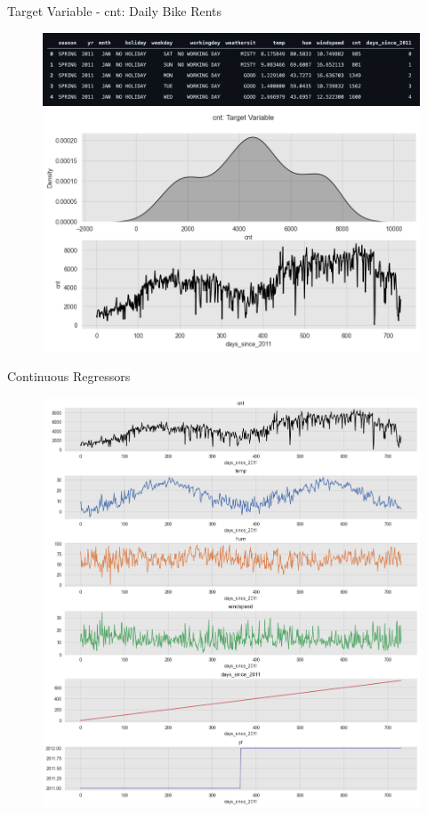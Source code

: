 \documentclass[10pt]{beamer}
\begin{document}
\begin{frame}{Target Variable -  cnt: Daily Bike Rents}
\begin{center}
  \begin{figure}
    \includegraphics[scale=0.35]{images/head.png} 
    \includegraphics[scale=0.4]{images/interpretable_ml_10_0.png}
  \end{figure}
\end{center}
\end{frame}

\begin{frame}{Continuous Regressors}
\begin{center}
  \begin{figure}
    \includegraphics[scale=0.25]{images/interpretable_ml_13_0.png} 
  \end{figure}
\end{center}
\end{frame}
\end{document}
